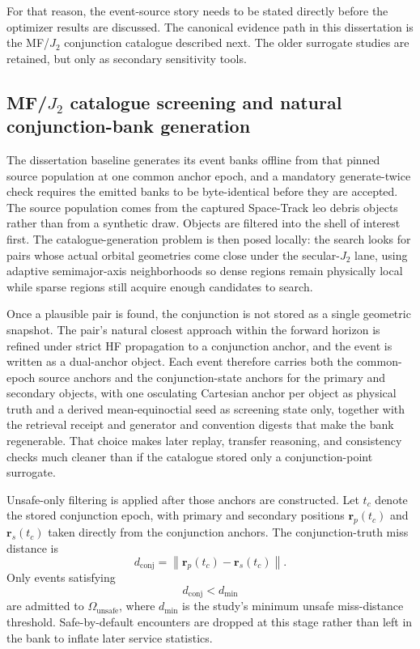     For that reason, the event-source story needs to be stated directly before the optimizer results are discussed. The canonical evidence path in this dissertation is the MF/\(J_2\) conjunction catalogue described next. The older surrogate studies are retained, but only as secondary sensitivity tools.

    \subsection{MF/\texorpdfstring{$J_2$}{J2} catalogue screening and natural conjunction-bank generation}
    The dissertation baseline generates its event banks offline from that pinned source population at one common anchor epoch, and a mandatory generate-twice check requires the emitted banks to be byte-identical before they are accepted. The source population comes from the captured Space-Track \gls{leo} debris objects rather than from a synthetic draw. Objects are filtered into the shell of interest first. The catalogue-generation problem is then posed locally: the search looks for pairs whose actual orbital geometries come close under the secular-\(J_2\) lane, using adaptive semimajor-axis neighborhoods so dense regions remain physically local while sparse regions still acquire enough candidates to search.

    Once a plausible pair is found, the conjunction is not stored as a single geometric snapshot. The pair's natural closest approach within the forward horizon is refined under strict HF propagation to a conjunction anchor, and the event is written as a dual-anchor object. Each event therefore carries both the common-epoch source anchors and the conjunction-state  anchors for the primary and secondary objects, with one osculating Cartesian anchor per object as physical truth and a derived mean-equinoctial seed as screening state only, together with the retrieval receipt and generator and convention digests that make the bank regenerable. That choice makes later replay, transfer reasoning, and consistency checks much cleaner than if the catalogue stored only a conjunction-point surrogate.

    Unsafe-only filtering is applied after those anchors are constructed. Let \(t_c\) denote the stored conjunction epoch, with primary and secondary positions \(\mathbf r_p(t_c)\) and \(\mathbf r_s(t_c)\) taken directly from the conjunction anchors. The conjunction-truth miss distance is
    \begin{equation}
        d_{\text{conj}} = \left\|\mathbf r_p(t_c) - \mathbf r_s(t_c)\right\|.
    \end{equation}
    Only events satisfying
    \begin{equation}
        d_{\text{conj}} < d_{\min}
    \end{equation}
    are admitted to \(\Omega_{\mathrm{unsafe}}\), where \(d_{\min}\) is the study's minimum unsafe miss-distance threshold. Safe-by-default encounters are dropped at this stage rather than left in the bank to inflate later service statistics.

